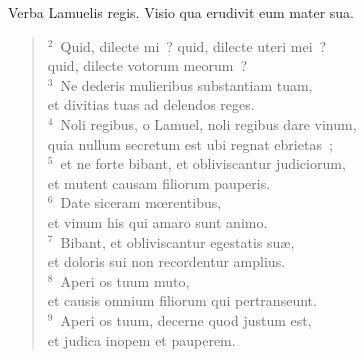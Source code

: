 \lettrine[lines=3,image=true,loversize=0.05,lraise=-0.03]{V}{}erba Lamuelis regis. Visio qua erudivit eum mater sua.
\begin{flushleft}\begin{verse}\vspace{6pt}${}^{2}$~Quid, dilecte mi~? quid, dilecte uteri mei~?\\ quid, dilecte votorum meorum~?\\
${}^{3}$~Ne dederis mulieribus substantiam tuam,\\ et divitias tuas ad delendos reges.\\
${}^{4}$~Noli regibus, o Lamuel, noli regibus dare vinum,\\ quia nullum secretum est ubi regnat ebrietas~;\\
${}^{5}$~et ne forte bibant, et obliviscantur judiciorum,\\ et mutent causam filiorum pauperis.\\
${}^{6}$~Date siceram mœrentibus,\\ et vinum his qui amaro sunt animo.\\
${}^{7}$~Bibant, et obliviscantur egestatis su\ae ,\\ et doloris sui non recordentur amplius.\\
${}^{8}$~Aperi os tuum muto,\\ et causis omnium filiorum qui pertranseunt.\\
${}^{9}$~Aperi os tuum, decerne quod justum est,\\ et judica inopem et pauperem.\end{verse}\end{flushleft}


